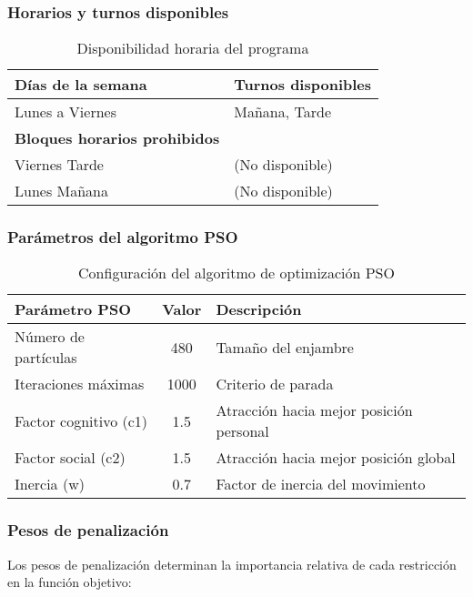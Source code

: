 \subsubsection{Horarios y turnos disponibles}
\begin{table}[ht]
\centering
\begin{tabular}{|l|l|}
\hline
\textbf{Días de la semana} & \textbf{Turnos disponibles} \\
\hline
Lunes a Viernes & Mañana, Tarde \\
\hline
\textbf{Bloques horarios prohibidos} & \\
\hline
Viernes Tarde & (No disponible) \\
Lunes Mañana & (No disponible) \\
\hline
\end{tabular}
\caption{Disponibilidad horaria del programa}
\end{table}

\newpage
\subsubsection{Parámetros del algoritmo PSO}
\begin{table}[ht]
\centering
\begin{tabular}{|l|c|l|}
\hline
\textbf{Parámetro PSO} & \textbf{Valor} & \textbf{Descripción} \\
\hline
Número de partículas & 480 & Tamaño del enjambre \\
Iteraciones máximas & 1000 & Criterio de parada \\
Factor cognitivo (c1) & 1.5 & Atracción hacia mejor posición personal \\
Factor social (c2) & 1.5 & Atracción hacia mejor posición global \\
Inercia (w) & 0.7 & Factor de inercia del movimiento \\
\hline
\end{tabular}
\caption{Configuración del algoritmo de optimización PSO}
\end{table}

\subsubsection{Pesos de penalización}
Los pesos de penalización determinan la importancia relativa de cada restricción en la función objetivo:

